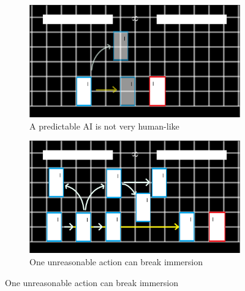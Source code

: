 \begin{figure}[h]
	\centering
	\begin{subfigure}[h]{0.4\textwidth}
		\centering
		\includegraphics[width=\textwidth]{Figures/LearningExample1.png}
		\caption{A predictable AI is not very human-like}
		\label{Learning1}
	\end{subfigure}
	\begin{subfigure}[h]{0.4\textwidth}
		\centering
		\includegraphics[width=\textwidth]{Figures/LearningExample2.png}
		\caption{One unreasonable action can break immersion}
		\label{Learning2}
	\end{subfigure}
\end{figure}




